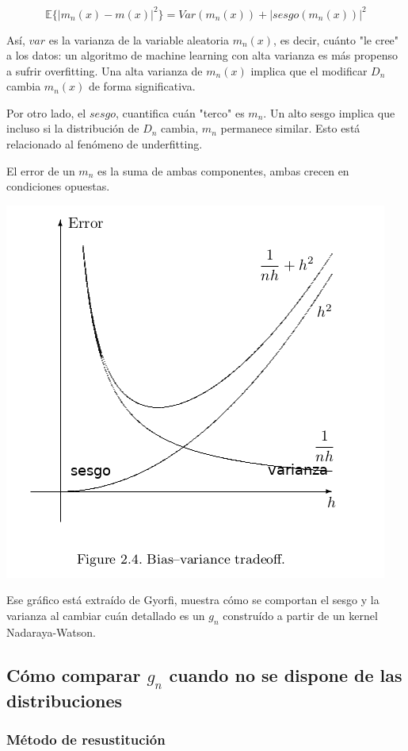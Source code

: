 \documentclass[12pt, a4paper]{article}
\begin{document}
$$ \mathds{E} \Big \{ |m_n(x)-m(x)|^2 \Big \} = Var(m_n(x)) + |sesgo(m_n(x))|^2 $$

Así, $var$ es la varianza de la variable aleatoria $m_n(x)$, es decir, cuánto "le cree" a los datos: un algoritmo de machine learning con alta varianza es más propenso a sufrir overfitting. Una alta varianza de $m_n(x)$ implica que el modificar $D_n$ cambia $m_n(x)$ de forma significativa.

Por otro lado, el $sesgo$, cuantifica cuán "terco" es $m_n$. Un alto sesgo implica que incluso si la distribución de $D_n$ cambia, $m_n$ permanece similar. Esto está relacionado al fenómeno de underfitting.

El error de un $m_n$ es la suma de ambas componentes, ambas crecen en condiciones opuestas. 

\includegraphics[scale=0.65]{bias-variance.png}

Ese gráfico está extraído de Gyorfi, muestra cómo se comportan el sesgo y la varianza al cambiar cuán detallado es un $g_n$ construído a partir de un kernel Nadaraya-Watson.

\subsection{Cómo comparar $g_n$ cuando no se dispone de las distribuciones}

\subsubsection{Método de resustitución}
\end{document}
